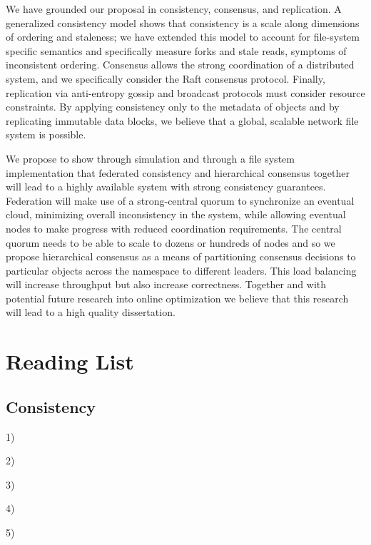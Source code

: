 \documentclass{article}
\begin{document}
We have grounded our proposal in consistency, consensus, and replication. A generalized consistency model shows that consistency is a scale along dimensions of ordering and staleness; we have extended this model to account for file-system specific semantics and specifically measure forks and stale reads, symptoms of inconsistent ordering. Consensus allows the strong coordination of a distributed system, and we specifically consider the Raft consensus protocol. Finally, replication via anti-entropy gossip and broadcast protocols must consider resource constraints. By applying consistency only to the metadata of objects and by replicating immutable data blocks, we believe that a global, scalable network file system is possible.

We propose to show through simulation and through a file system implementation that federated consistency and hierarchical consensus together will lead to a highly available system with strong consistency guarantees. Federation will make use of a strong-central quorum to synchronize an eventual cloud, minimizing overall inconsistency in the system, while allowing eventual nodes to make progress with reduced coordination requirements. The central quorum needs to be able to scale to dozens or hundreds of nodes and so we propose hierarchical consensus as a means of partitioning consensus decisions to particular objects across the namespace to different leaders. This load balancing will increase throughput but also increase correctness. Together and with potential future research into online optimization we believe that this research will lead to a high quality dissertation.

\newpage

\appendix
\section{Reading List}
\label{app:readinglist}

\subsection{Consistency}

1) 

2) 

3) 

4) 

5) 
\end{document}
